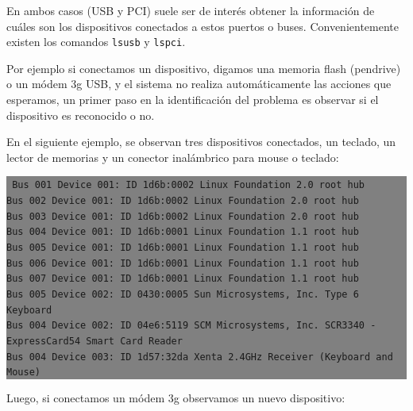 \documentclass[12pt]{article}
\begin{document}
En ambos casos (USB y PCI) suele ser de interés obtener la información de cuáles son 
los dispositivos conectados a estos puertos o buses. Convenientemente existen los 
comandos \texttt{lsusb} y \texttt{lspci}. 

Por ejemplo si conectamos un dispositivo, digamos una memoria flash (pendrive) o un 
módem 3g USB, y el sistema no realiza automáticamente las acciones que esperamos, un primer paso en la 
identificación del problema es observar si el dispositivo es reconocido o no. 

En el siguiente ejemplo, se observan tres dispositivos conectados, un teclado, 
un lector de memorias y un conector inalámbrico para mouse o teclado: 
 
\colorbox{grey}{\parbox[t]{0.95\linewidth}{ \vspace*{0.5cm} { 
{\tt
Bus 001 Device 001: ID 1d6b:0002 Linux Foundation 2.0 root hub\\
Bus 002 Device 001: ID 1d6b:0002 Linux Foundation 2.0 root hub\\
Bus 003 Device 001: ID 1d6b:0002 Linux Foundation 2.0 root hub\\
Bus 004 Device 001: ID 1d6b:0001 Linux Foundation 1.1 root hub\\
Bus 005 Device 001: ID 1d6b:0001 Linux Foundation 1.1 root hub\\
Bus 006 Device 001: ID 1d6b:0001 Linux Foundation 1.1 root hub\\
Bus 007 Device 001: ID 1d6b:0001 Linux Foundation 1.1 root hub\\
Bus 005 Device 002: ID 0430:0005 Sun Microsystems, Inc. Type 6 Keyboard\\
Bus 004 Device 002: ID 04e6:5119 SCM Microsystems, Inc. SCR3340 - ExpressCard54 Smart Card Reader\\
Bus 004 Device 003: ID 1d57:32da Xenta 2.4GHz Receiver (Keyboard and Mouse)
}
} \vspace*{0.5cm} } } 

Luego, si conectamos un módem 3g observamos un nuevo dispositivo: 
\end{document}
